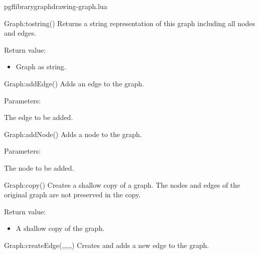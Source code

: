 
\begin{filedescription}{pgflibrarygraphdrawing-graph.lua}


\begin{luacommand}{{Graph:\textunderscore{}\textunderscore{}tostring}()}
Returns a string representation of this graph including all nodes and edges. 


Return value:
\begin{itemize} \item[] Graph as string.  \end{itemize}


\end{luacommand}\begin{luacommand}{{Graph:addEdge}()}
Adds an edge to the graph. 

Parameters:
\begin{parameterdescription}
	\item[\meta{edge}] The edge to be added. 
\end{parameterdescription}



\end{luacommand}\begin{luacommand}{{Graph:addNode}()}
Adds a node to the graph. 

Parameters:
\begin{parameterdescription}
	\item[\meta{node}] The node to be added. 
\end{parameterdescription}



\end{luacommand}\begin{luacommand}{{Graph:copy}()}
Creates a shallow copy of a graph.  The nodes and edges of the original graph are not preserved in the copy. 


Return value:
\begin{itemize} \item[] A shallow copy of the graph.  \end{itemize}


\end{luacommand}\begin{luacommand}{{Graph:createEdge}(,,,,,)}
Creates and adds a new edge to the graph. 


\end{luacommand}
\end{filedescription}
